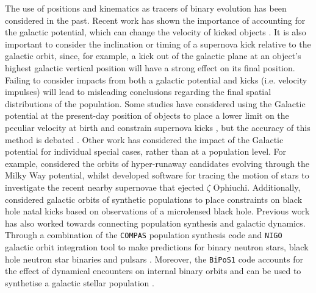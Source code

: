 \documentclass[twocolumn, twocolappendix, oneside]{aastex631}
\newcommand{\invisibleedit}[1]{#1}
\begin{document}
The use of positions and kinematics as tracers of binary evolution has been considered in the past. Recent work has shown the importance of accounting for the galactic potential, which can change the velocity of kicked objects \citep[e.g.,][]{Disberg+2024:2024A&A...687A.272D}. It is also important to consider the inclination or timing of a supernova kick relative to the galactic orbit, since, for example, a kick out of the galactic plane at an object's highest galactic vertical position will have a strong effect on its final position. Failing to consider impacts from both a galactic potential and kicks (i.e. velocity impulses) will lead to misleading conclusions regarding the final spatial distributions of the population. Some studies have considered using the Galactic potential at the present-day position of objects to place a lower limit on the peculiar velocity at birth and constrain supernova kicks \citep{Repetto+2012:2012MNRAS.425.2799R, Repetto+2015:2015MNRAS.453.3341R, Repetto+2017:2017MNRAS.467..298R, atri:19}, but the accuracy of this method is debated \citep{Mandel+2016:2016MNRAS.456..578M}. Other work has considered the impact of the Galactic potential for individual special cases, rather than at a population level. For example, \citet{Evans+2020:2020MNRAS.497.5344E} considered the orbits of hyper-runaway candidates evolving through the Milky Way potential, whilst \citet{Neuhauser+2020:2020MNRAS.498..899N} developed software for tracing the motion of stars to investigate the recent nearby supernovae that ejected $\zeta$ Ophiuchi. \invisibleedit{Additionally, \citet{Andrews+2022:2022ApJ...930..159A} considered galactic orbits of synthetic populations to place constraints on black hole natal kicks based on observations of a microlensed black hole. Previous work has also worked towards connecting population synthesis and galactic dynamics. Through a combination of the \texttt{COMPAS} population synthesis code \citep{COMPAS} and \texttt{NIGO} galactic orbit integration tool \citep{Rossi+2015:2015A&C....12...11R} to make predictions for binary neutron stars, black hole neutron star binaries and pulsars \citep{Chattopadhyay+2020:2020MNRAS.494.1587C, Chattopadhyay+2021:2021MNRAS.504.3682C, Song+2024:2024arXiv240611428S}. Moreover, the \texttt{BiPoS1} code accounts for the effect of dynamical encounters on internal binary orbits and can be used to synthetise a galactic stellar population \citep{Dabringhausen+2022:2022MNRAS.510..413D}.}

\end{document}
